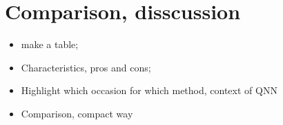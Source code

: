 

\tableofcontents
\pagebreak













% 

% 

% 

\section{Comparison, disscussion}
\begin{itemize}
    \item make a table;
    \item Characteristics, pros and cons;
    \item Highlight which occasion for which method, context of QNN
    \item Comparison, compact way
\end{itemize}



